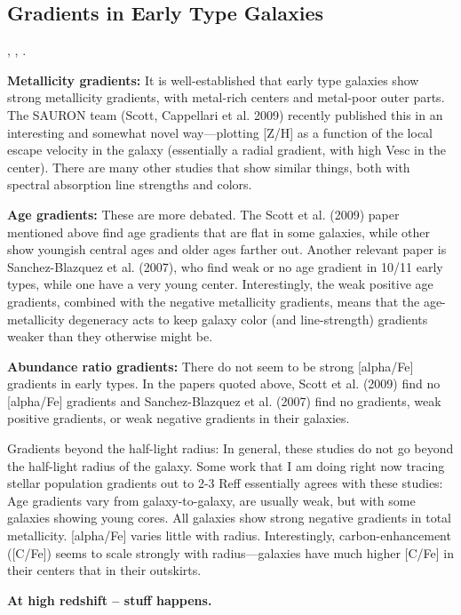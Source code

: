 \documentclass{emulateapj}
\begin{document}
\subsection{Gradients in Early Type Galaxies}

\citep{Somerville:2003aa}, \citep{Ferguson:2004qw},
\citep{Moustakas:1998tn}. 

{\bf Metallicity gradients:} It is well-established that early type galaxies
show strong metallicity gradients, with metal-rich centers and
metal-poor outer parts.  The SAURON team (Scott, Cappellari et
al. 2009) recently published this in an interesting and somewhat novel
way---plotting [Z/H] as a function of the local escape velocity in the
galaxy (essentially a radial gradient, with high Vesc in the center).
There are many other studies that show similar things, both with
spectral absorption line strengths and colors.

{\bf Age gradients:} These are more debated.  The Scott et al. (2009) paper
mentioned above find age gradients that are flat in some galaxies,
while other show youngish central ages and older ages farther out.
Another relevant paper is Sanchez-Blazquez et al. (2007), who find
weak or no age gradient in 10/11 early types, while one have a very
young center.  Interestingly, the weak positive age gradients,
combined with the negative metallicity gradients, means that the
age-metallicity degeneracy acts to keep galaxy color (and
line-strength) gradients weaker than they otherwise might be.

{\bf Abundance ratio gradients:} There do not seem to be strong [alpha/Fe]
gradients in early types.  In the papers quoted above, Scott et
al. (2009) find no [alpha/Fe] gradients and Sanchez-Blazquez et
al. (2007) find no gradients, weak positive gradients, or weak
negative gradients in their galaxies.

Gradients beyond the half-light radius: In general, these studies do
not go beyond the half-light radius of the galaxy.  Some work that I
am doing right now tracing stellar population gradients out to 2-3
Reff essentially agrees with these studies: Age gradients vary from
galaxy-to-galaxy, are usually weak, but with some galaxies showing
young cores.  All galaxies show strong negative gradients in total
metallicity.  [alpha/Fe] varies little with radius.  Interestingly,
carbon-enhancement ([C/Fe]) seems to scale strongly with
radius---galaxies have much higher [C/Fe] in their centers that in
their outskirts.

{\bf At high redshift -- stuff happens. }
\end{document}
